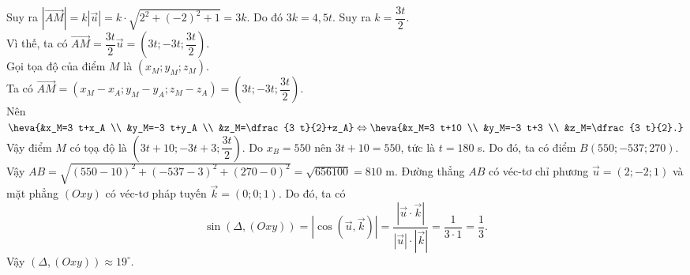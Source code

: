 \begin{ex}
{\begin{itemchoice}
			Suy ra $\left|\overrightarrow{A M}\right|=k|\overrightarrow{u}|=k \cdot \sqrt{2^2+(-2)^2+1}=3 k$. Do đó $3 k=4{,}5 t$. Suy ra $k=\dfrac{3 t}{2}$. \\
			Vì thế, ta có $\overrightarrow{A M}=\dfrac{3 t}{2} \overrightarrow{u}=\left(3 t ;-3 t ; \dfrac{3 t}{2}\right)$.\\
			Gọi tọa độ của điểm $M$ là $\left(x_M ; y_M ; z_M\right)$.\\
			Ta có $\overrightarrow{A M}=\left(x_M-x_A ; y_M-y_A ; z_M-z_A\right)=\left(3 t ;-3 t ; \dfrac{3 t}{2}\right)$.\\
			Nên $\heva{&x_M=3 t+x_A \\ &y_M=-3 t+y_A \\ &z_M=\dfrac{3 t}{2}+z_A}\Leftrightarrow\heva{&x_M=3 t+10 \\ &y_M=-3 t+3 \\ &z_M=\dfrac{3 t}{2}.}$\\
			Vậy điểm $M$ có tọạ độ là $\left(3 t+10 ;-3 t+3 ;\dfrac{3 t}{2}\right)$.
			\itemch Do $x_B=550$ nên $3 t+10=550$, tức là $t=180$ s. Do đó, ta có điểm $B(550 ;-537 ; 270)$. \\
			Vậy $A B=\sqrt{(550-10)^2+(-537-3)^2+(270-0)^2}=\sqrt{656100}=810$ m.
			\itemch Đường thẳng $AB$ có véc-tơ chỉ phương $\overrightarrow{u}=(2 ;-2 ; 1)$ và mặt phẳng $(Oxy)$ có véc-tơ pháp tuyến $\overrightarrow{k}=(0 ; 0 ; 1)$. Do đó, ta có
			$$
			\sin (\Delta,(O x y))=|\cos (\overrightarrow{u},\overrightarrow{k})|=\dfrac{\left|\overrightarrow{u} \cdot \overrightarrow{k}\right|}{|\overrightarrow{u}| \cdot|\overrightarrow{k}|}=\dfrac{1}{3 \cdot 1}=\dfrac{1}{3}.$$
			Vậy $(\Delta,(O x y)) \approx 19^{\circ}$.
		\end{itemchoice}
	}
\end{ex}
